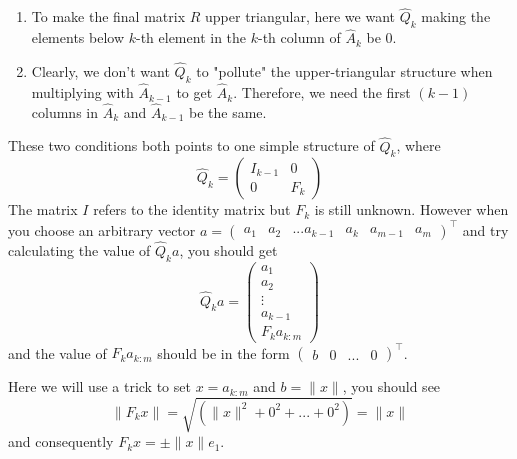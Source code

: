 \begin{enumerate}
  \item To make the final matrix \(R\)  upper triangular, here we want \(\hat{Q}_k\) making the elements below \(k\)-th element in the \(k\)-th column of \(\hat{A}_k\) be 0. 
  \item Clearly, we don't want \(\hat{Q}_k\) to "pollute" the upper-triangular structure when multiplying with \(\hat{A}_{k -1 }\) to get \(\hat{A}_{k}\). Therefore, we need the first \((k - 1)\) columns in \(\hat{A}_{k}\) and \(\hat{A}_{k - 1}\) be the same.          
\end{enumerate}
These two conditions both points to one simple structure of \(\hat{Q}_k\), where
\[
  \hat{Q}_{k} = \begin{pmatrix} 
    I_{k - 1} & 0 \\
    0 & F_{k} 
  \end{pmatrix} 
\]
The matrix \(I\) refers to the identity matrix but \(F_{k}\) is still unknown. However when you choose an arbitrary vector \(a =  \begin{pmatrix} 
  a_1 & a_2 & ...a_{k - 1} & a_{k} & a_{m - 1} & a_{m} 
\end{pmatrix}^{\top} \) and try calculating the value of \(\hat{Q}_{k}a\), you should get
\[
  \hat{Q}_{k}a = \begin{pmatrix} 
    a_1 \\
    a_2 \\
    \vdots \\
    a_{k - 1} \\
    F_k a_{k:m}
  \end{pmatrix} 
\]
and the value of \(F_{k}a_{k:m}\) should be in the form \(\begin{pmatrix} 
  b & 0 & ... & 0 
\end{pmatrix}^{\top} \).

\noindent Here we will use a trick to set \(x = a_{k:m}\) and \(b = \|x\|\), you should see 
\[
  \|F_{k}x\| = \sqrt{(\|x\|^2 + 0^2 + ... + 0^2)} = \|x\|
\] and consequently \(F_kx = \pm \|x\|e_1\). \medskip

